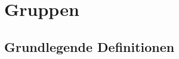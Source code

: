 \documentclass[a4paper,10pt,german]{scrbook}
\theoremstyle{saetze}
\theoremstyle{definitionen}
\begin{document}
\newcommand{\sbew}[1]
{\definecolor{shadecolor}{rgb}{0.85,0.85,1}%
 \begin{ourshaded}%
 \textit{\textbf{Beweis:}} #1%
 \hfill \rule{2,1mm}{2,1mm}%
 \end{ourshaded}
}

\newcommand{\bsp}[1]
{\definecolor{shadecolor}{rgb}{0.85,1,0.85}%
 \begin{ourshaded}%
 \textit{\textbf{Beispiel:}} #1%
 \end{ourshaded} 
}

\newcommand{\ra}[0]{\rightarrow}
\newcommand{\ds}[0]{\displaystyle}
\newcommand{\cd}[0]{\cdot}
\newcommand{\lra}[0]{\Leftrightarrow}
\newcommand{\Ra}[0]{\Rightarrow}

\newcommand{\para}[1]{\noindent \Large\textbf{#1} \normalsize}

\newcommand{\defeqr}[0]{\mathrel{\mathop:}=}
\newcommand{\defeql}[0]{=\mathrel{\mathop:}}

\newcommand{\chk}[0]{\checkmark}
\newcommand{\wt}[0]{\widetilde}

\newcommand{\Kern}{\mathop{\rm Kern}\nolimits}
\newcommand{\Bild}{\mathop{\rm Bild}\nolimits}
\newcommand{\ord}{\mathop{\rm ord}\nolimits}

\maketitle

\tableofcontents


\chapter{Gruppen}

\section{Grundlegende Definitionen}
\end{document}
